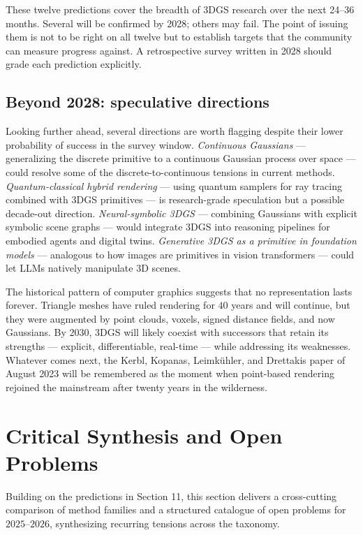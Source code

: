 These twelve predictions cover the breadth of 3DGS research over the next 24--36 months. Several will be confirmed by 2028; others may fail. The point of issuing them is not to be right on all twelve but to establish targets that the community can measure progress against. A retrospective survey written in 2028 should grade each prediction explicitly.

\subsection{Beyond 2028: speculative directions}\label{beyond-2028-speculative-directions}

Looking further ahead, several directions are worth flagging despite their lower probability of success in the survey window. \emph{Continuous Gaussians} --- generalizing the discrete primitive to a continuous Gaussian process over space --- could resolve some of the discrete-to-continuous tensions in current methods. \emph{Quantum-classical hybrid rendering} --- using quantum samplers for ray tracing combined with 3DGS primitives --- is research-grade speculation but a possible decade-out direction. \emph{Neural-symbolic 3DGS} --- combining Gaussians with explicit symbolic scene graphs --- would integrate 3DGS into reasoning pipelines for embodied agents and digital twins. \emph{Generative 3DGS as a primitive in foundation models} --- analogous to how images are primitives in vision transformers --- could let LLMs natively manipulate 3D scenes.

The historical pattern of computer graphics suggests that no representation lasts forever. Triangle meshes have ruled rendering for \(40\) years and will continue, but they were augmented by point clouds, voxels, signed distance fields, and now Gaussians. By 2030, 3DGS will likely coexist with successors that retain its strengths --- explicit, differentiable, real-time --- while addressing its weaknesses. Whatever comes next, the Kerbl, Kopanas, Leimkühler, and Drettakis paper of August 2023 will be remembered as the moment when point-based rendering rejoined the mainstream after twenty years in the wilderness.

\section{Critical Synthesis and Open Problems}\label{critical-synthesis-and-open-problems}

Building on the predictions in Section 11, this section delivers a cross-cutting comparison of method families and a structured catalogue of open problems for \(2025\)--\(2026\), synthesizing recurring tensions across the taxonomy.

